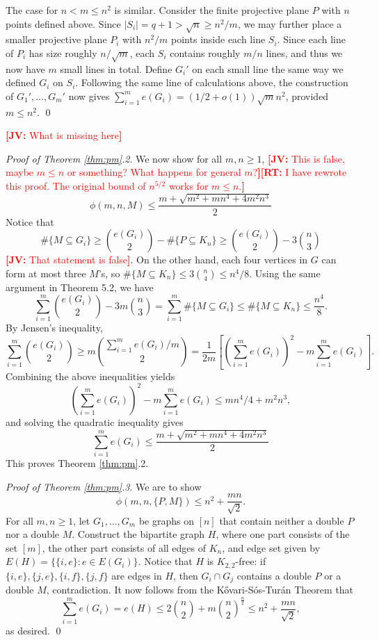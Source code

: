 \documentclass[12pt]{article}
\newcommand{\jv}[1]{\textcolor{red}{\textbf{[JV: } #1\textbf{]}}}
\newcommand{\rt}[1]{\textcolor{red}{\textbf{[RT: } #1\textbf{]}}}
\begin{document}
    The case for $n < m \leq n^2$ is similar. Consider the finite projective plane $P$ with $n$ points defined above. Since $|S_i| = q + 1 > \sqrt{n} \geq n^2/m$, we may further place a smaller projective plane $P_i$ with $n^2/m$ points inside each line $S_i$. Since each line of $P_i$ has size roughly $n/\sqrt{m}$, each $S_i$ contains roughly $m/n$ lines, and thus we now have $m$ small lines in total. Define $G_i'$ on each small line the same way we defined $G_i$ on $S_i$. Following the same line of calculations above, the construction of $G_1', \ldots, G_m'$ now gives $\sum_{i = 1}^m e(G_i) = (1/2 + o(1))\sqrt{m}n^2$, provided $m \leq n^2$. 
    \qed

  \jv{What is missing here}
    
  \textit{Proof of Theorem \ref{thm:pm}.2}.
  We now show for all $m,n \geq 1$, \jv{This is false, maybe $m \leq n$ or something? What happens for general $m$?}\rt{I have rewrote this proof. The original bound of $n^{5/2}$ works for $m \leq n$.}
  \[
    \phi(m, n, M) \leq \frac{m + \sqrt{m^2 + mn^4 + 4m^2n^3}}{2}
  \]
  Notice that
  \[
    \#\{M \subseteq G_i\} \geq \binom{e(G_i)}{2} - \#\{P \subseteq K_n\} \geq \binom{e(G_i)}{2}- 3\binom{n}{3}
  \]
  \jv{That statement is false}. On the other hand, each four vertices in $G$ can form at most three $M$'s, so $\#\{M \subseteq K_n\} \leq 3\binom{n}{4} \leq n^4/8$. Using the same argument in Theorem 5.2, we have 
  \[
    \sum_{i = 1}^m \binom{e(G_i)}{2} - 3m\binom{n}{3} = \sum_{i = 1}^m \#\{M \subseteq G_i\} \leq \#\{M \subseteq K_n\} \leq \frac{n^4}{8}.
  \]
  By Jensen's inequality,
  \[
    \sum_{i = 1}^m \binom{e(G_i)}{2} \geq m\binom{\sum_{i = 1}^m e(G_i)/m}{2} = \frac{1}{2m}\left[\left(\sum_{i = 1}^m e(G_i)\right)^2 - m\sum_{i = 1}^m e(G_i)\right].
  \]
  Combining the above inequalities yields
  \[
    \left(\sum_{i = 1}^m e(G_i)\right)^2 - m\sum_{i = 1}^m e(G_i) \leq mn^4/4 + m^2n^3,
  \]
  and solving the quadratic inequality gives
  \[
    \sum_{i = 1}^m e(G_i) \leq \frac{m + \sqrt{m^2 + mn^4 + 4m^2n^3}}{2}
  \]
This proves Theorem \ref{thm:pm}.2.

\textit{Proof of Theorem \ref{thm:pm}.3}.
  We are to show 
  \[
    \phi(m, n, \{P, M\}) \leq n^2 + \frac{mn}{\sqrt{2}}.
  \]
  For all $m,n \geq 1$, let $G_1, \ldots, G_m$ be graphs on $[n]$ that contain neither a double $P$ nor a double $M$. Construct the bipartite graph $H$, where one part consists of the set $[m]$, the other part consists of all edges of $K_n$, and edge set given by $E(H) = \{\{i, e\} : e \in E(G_i)\}$. Notice that $H$ is $K_{2, 2}$-free: if $\{i, e\}, \{j, e\}, \{i, f\}, \{j, f\}$ are edges in $H$, then $G_i \cap G_j$ contains a double $P$ or a double $M$, contradiction. It now follows from the K\H{o}vari-S\'{o}s-Tur\'{a}n Theorem that
  \[
    \sum_{i = 1}^m e(G_i) = e(H) \leq 2\binom{n}{2} + m\binom{n}{2}^{\frac{n}{2}} \leq n^2 + \frac{mn}{\sqrt{2}},
  \]
  as desired. \qed
\end{document}
